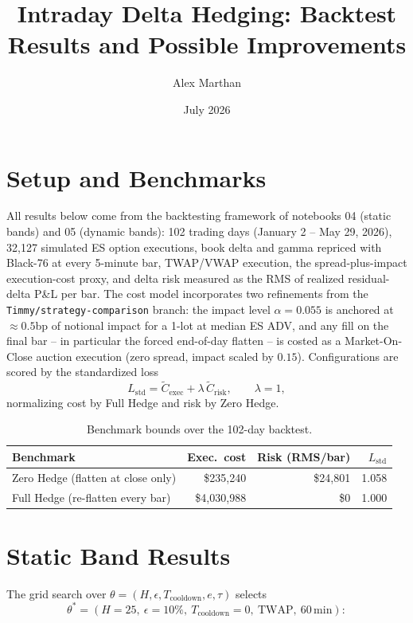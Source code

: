 \documentclass[11pt]{article}
\title{Intraday Delta Hedging: Backtest Results and Possible Improvements}
\author{Alex Marthan}
\date{July 2026}
\begin{document}
\maketitle

\section{Setup and Benchmarks}

All results below come from the backtesting framework of notebooks 04
(static bands) and 05 (dynamic bands): 102 trading days
(January 2 -- May 29, 2026), 32{,}127 simulated ES option executions, book delta and
gamma repriced with Black-76 at every 5-minute bar, TWAP/VWAP execution, the
spread-plus-impact execution-cost proxy, and delta risk measured as the RMS of realized
residual-delta P\&L per bar. The cost model incorporates two refinements from the
\texttt{Timmy/strategy-comparison} branch: the impact level $\alpha = 0.055$ is anchored
at $\approx 0.5$bp of notional impact for a 1-lot at median ES ADV, and any fill on the
final bar -- in particular the forced end-of-day flatten -- is costed as a
Market-On-Close auction execution (zero spread, impact scaled by $0.15$). Configurations are scored by the standardized loss
\[
L_{\text{std}} = \widetilde{C}_{\text{exec}} + \lambda\,\widetilde{C}_{\text{risk}},
\qquad \lambda = 1,
\]
normalizing cost by Full Hedge and risk by Zero Hedge.

\begin{table}[htbp]
\centering
\small
\begin{tabular}{lrrr}
\toprule
\textbf{Benchmark} & \textbf{Exec.\ cost} & \textbf{Risk (RMS/bar)} & $L_{\text{std}}$ \\
\midrule
Zero Hedge (flatten at close only) & \$235{,}240 & \$24{,}801 & 1.058 \\
Full Hedge (re-flatten every bar)  & \$4{,}030{,}988 & \$0        & 1.000 \\
\bottomrule
\end{tabular}
\caption{Benchmark bounds over the 102-day backtest.}
\end{table}

\section{Static Band Results}

The grid search over $\theta = (H, \epsilon, T_{\text{cooldown}}, e, \tau)$ selects
\[
\theta^{*} = (H{=}25,\ \epsilon{=}10\%,\ T_{\text{cooldown}}{=}0,\ \text{TWAP},\ 60\,\text{min}):
\]
\end{document}
